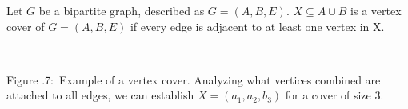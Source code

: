 \documentclass[twoside]{article}
\newcounter{lecnum}
\newcommand{\fig}[3]{
      \vspace{#2}
      \begin{center}
      Figure \thelecnum.#1:~#3
      \end{center}
  }
\begin{document}
Let $G$ be a bipartite graph, described as $G=(A,B,E)$. $X \subseteq A\cup B$ is a vertex cover of $G=(A,B,E)$ if every edge is adjacent to at least one vertex in X.\\
\begin{center}
\\
\end{center}
\fig{7}{0in}{Example of a vertex cover. Analyzing what vertices combined are attached to all edges, we can establish $X=(a_1, a_2, b_3)$ for a cover of size 3.}
\end{document}
